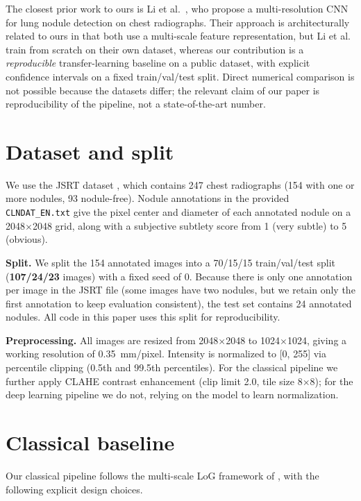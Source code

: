 \documentclass[11pt]{article}
\begin{document}
The closest prior work to ours is Li et al.~\cite{li2020multi}, who propose
a multi-resolution CNN for lung nodule detection on chest radiographs.
Their approach is architecturally related to ours in that both use a
multi-scale feature representation, but Li et al. train from scratch on
their own dataset, whereas our contribution is a \textit{reproducible}
transfer-learning baseline on a public dataset, with explicit
confidence intervals on a fixed train/val/test split. Direct numerical
comparison is not possible because the datasets differ; the relevant
claim of our paper is reproducibility of the pipeline, not a
state-of-the-art number.

\section{Dataset and split}
\label{sec:data}

We use the JSRT dataset \cite{shiraishi2000jsrt}, which contains 247 chest
radiographs (154 with one or more nodules, 93 nodule-free). Nodule annotations
in the provided \texttt{CLNDAT\_EN.txt} give the pixel center and diameter of
each annotated nodule on a 2048$\times$2048 grid, along with a subjective
subtlety score from 1 (very subtle) to 5 (obvious).

\textbf{Split.} We split the 154 annotated images into a 70/15/15
train/val/test split (\textbf{107/24/23} images) with a fixed seed of 0.
Because there is only one annotation per image in the JSRT file (some images
have two nodules, but we retain only the first annotation to keep evaluation
consistent), the test set contains 24 annotated nodules. All code in this
paper uses this split for reproducibility.

\textbf{Preprocessing.} All images are resized from 2048$\times$2048 to
1024$\times$1024, giving a working resolution of 0.35~mm/pixel. Intensity is
normalized to [0, 255] via percentile clipping (0.5th and 99.5th percentiles).
For the classical pipeline we further apply CLAHE contrast enhancement
(clip limit 2.0, tile size 8$\times$8); for the deep learning pipeline we
do not, relying on the model to learn normalization.

\section{Classical baseline}
\label{sec:classical}

Our classical pipeline follows the multi-scale LoG framework of
\cite{ginneken2001}, with the following explicit design choices.
\end{document}
